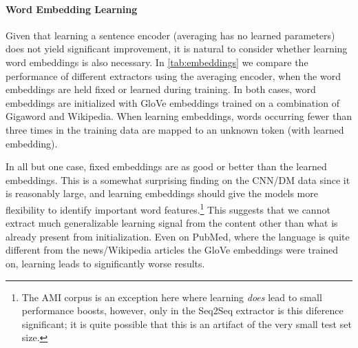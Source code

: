 




\paragraph{Word Embedding Learning}
 Given that learning a sentence encoder (averaging has no learned parameters)
 does not yield significant improvement, it is natural to consider whether
 learning word embeddings is also necessary. 
 In \autoref{tab:embeddings} we compare the performance of different extractors
 using the averaging encoder, when the word embeddings are held fixed or 
 learned during training. In both cases, word embeddings are initialized with
 GloVe embeddings trained on a combination of Gigaword and Wikipedia.
 When learning embeddings, words occurring 
 fewer than three times in the training data are mapped to an unknown
 token (with learned embedding).
 
 In all but one case,
fixed embeddings are as good or better than the learned embeddings.
This is a somewhat surprising finding on the CNN/DM data since it is reasonably
large, and learning embeddings should give the models more
flexibility to identify important word features.\footnote{The AMI corpus is an exception here where learning \emph{does} lead to small
performance boosts, however, only in the Seq2Seq extractor is this diference 
significant; it is quite possible that this is an artifact of the very small
test set size.}
This suggests that we cannot extract much generalizable learning signal 
from the content other than what is already present from initialization. 
Even on PubMed, where the language is quite different from the news/Wikipedia
articles the GloVe embeddings were trained on, learning leads to 
significantly worse results.

